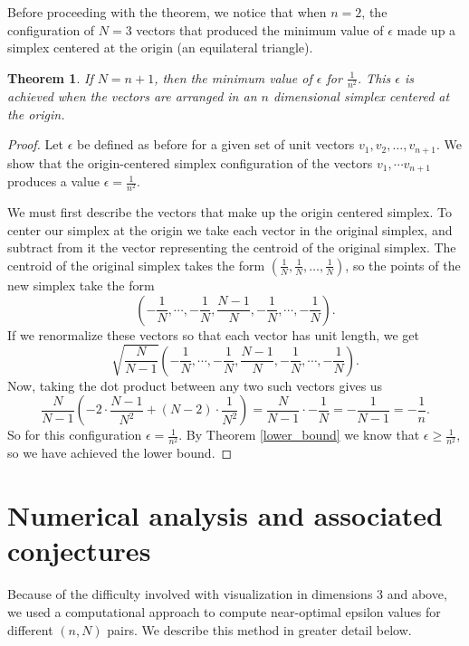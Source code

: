 \documentclass[11pt,letterpaper,twoside,english]{article}
\theoremstyle{theorem}
\newtheorem{theorem}{Theorem}[section]
\theoremstyle{remark}
\begin{document}
Before proceeding with the theorem, we notice that when $n=2$, the configuration of $N=3$ vectors that produced the minimum value of $\epsilon$ made up a simplex centered at the origin (an equilateral triangle). 


\begin{theorem}
If $N=n+1$, then the minimum value of $\epsilon$ for $\frac{1}{n^2}$. This $\epsilon$ is achieved when the vectors are arranged in an $n$ dimensional simplex centered at the origin.
\label{simplex}
\end{theorem}

\begin{proof}
Let $\epsilon$ be defined as before for a given set of unit vectors $v_1, v_2, \ldots, v_{n+1}$. We show that the origin-centered simplex configuration of the vectors $v_1,\cdots v_{n+1}$ produces a value $\epsilon=\frac{1}{n^2}$. 

We must first describe the vectors that make up the origin centered simplex. To center our simplex at the origin we take each vector in the original simplex, and subtract from it the vector representing the centroid of the original simplex. The centroid of the original simplex takes the form $(\frac{1}{N},\frac{1}{N},\ldots,\frac{1}{N})$, so the points of the new simplex take the form
$$
\left(-\frac{1}{N},\cdots,-\frac{1}{N},\frac{N-1}{N},-\frac{1}{N},\cdots,-\frac{1}{N}\right).
$$
If we renormalize these vectors so that each vector has unit length, we get 
$$
\sqrt{\frac{N}{N-1}}\left(-\frac{1}{N},\cdots,-\frac{1}{N},\frac{N-1}{N},-\frac{1}{N},\cdots,-\frac{1}{N}\right).
$$
Now, taking the dot product between any two such vectors gives us
$$
\frac{N}{N-1}\left(-2\cdot\frac{N-1}{N^2}+(N-2)\cdot\frac{1}{N^2}\right)=\frac{N}{N-1}\cdot-\frac{1}{N}=-\frac{1}{N-1}=-\frac{1}{n}.
$$
So for this configuration $\epsilon=\frac{1}{n^2}$. By Theorem \ref{lower_bound} we know that $\epsilon\ge \frac{1}{n^2}$, so we have achieved the lower bound. 
\end{proof}
\section{Numerical analysis and associated conjectures}

Because of the difficulty involved with visualization in dimensions 3 and above, we used a computational approach to compute near-optimal epsilon values for different $(n, N)$ pairs. We describe this method in greater detail below.
\end{document}

